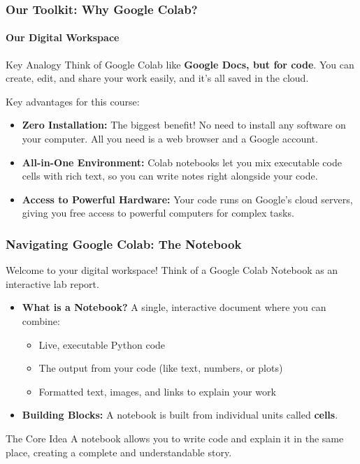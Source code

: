 \documentclass{beamer}
\begin{document}
\begin{frame}[fragile]
    \frametitle{Our Toolkit: Why Google Colab?}
    \framesubtitle{Our Digital Workspace}
    
    \begin{block}{Key Analogy}
        Think of Google Colab like \textbf{Google Docs, but for code}. You can create, edit, and share your work easily, and it's all saved in the cloud.
    \end{block}
    
    Key advantages for this course:
    \begin{itemize}
        \item<1-> \textbf{Zero Installation:} The biggest benefit! No need to install any software on your computer. All you need is a web browser and a Google account.
        
        \item<2-> \textbf{All-in-One Environment:} Colab notebooks let you mix executable code cells with rich text, so you can write notes right alongside your code.
        
        \item<3-> \textbf{Access to Powerful Hardware:} Your code runs on Google's cloud servers, giving you free access to powerful computers for complex tasks.
    \end{itemize}
    
\end{frame}

\begin{frame}[fragile]
    \frametitle{Navigating Google Colab: The Notebook}
    
    Welcome to your digital workspace! Think of a Google Colab Notebook as an interactive lab report.
    
    \vspace{1em}
    
    \begin{itemize}
        \item \textbf{What is a Notebook?} A single, interactive document where you can combine:
        \begin{itemize}
            \item Live, executable Python code
            \item The output from your code (like text, numbers, or plots)
            \item Formatted text, images, and links to explain your work
        \end{itemize}
        
        \item \textbf{Building Blocks:} A notebook is built from individual units called \textbf{cells}.
    \end{itemize}

    \begin{block}{The Core Idea}
        A notebook allows you to write code and explain it in the same place, creating a complete and understandable story.
    \end{block}
    
\end{frame}
\end{document}
